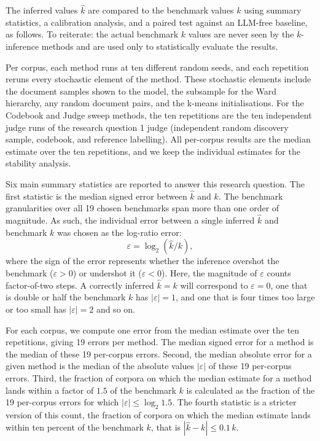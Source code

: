 \documentclass[11pt,a4paper,oneside]{report}
\begin{document}
The inferred values $\hat{k}$ are compared to the benchmark values $k$ using summary statistics, a calibration analysis, and a paired test against an LLM-free baseline, as follows. To reiterate: the actual benchmark $k$ values are never seen by the $k$-inference methods and are used only to statistically evaluate the results.

Per corpus, each method runs at ten different random seeds, and each repetition reruns every stochastic element of the method.  These stochastic elements include the document samples shown to the model, the subsample for the Ward hierarchy, any random document pairs, and the k-means initialisations. For the Codebook and Judge sweep methods, the ten repetitions are the ten independent judge runs of the research question 1 judge (independent random discovery sample, codebook, and reference labelling). All per-corpus results are the median estimate over the ten repetitions, and we keep the individual estimates for the stability analysis.

Six main summary statistics are reported to answer this research question. The first statistic is the median signed error between $\hat{k}$ and $k$. The benchmark granularities over all 19 chosen benchmarks span more than one order of magnitude. As such, the individual error between a single inferred $\hat{k}$ and benchmark $k$ was chosen as the log-ratio error:
\[
\varepsilon = \log_2\!\left(\hat{k} / k\right),
\]
where the sign of the error represents whether the inference overshot the benchmark ($\varepsilon > 0$) or undershot it ($\varepsilon < 0$). Here, the magnitude of $\varepsilon$ counts factor-of-two steps. A correctly inferred $\hat{k} = k$ will correspond to $\varepsilon = 0$, one that is double or half the benchmark $k$ has $|\varepsilon| = 1$, and one that is four times too large or too small has $|\varepsilon| = 2$ and so on.

For each corpus, we compute one error from the median estimate over the ten repetitions, giving 19 errors per method. The median signed error for a method is the median of these 19 per-corpus errors. Second, the median absolute error for a given method is the median of the absolute values $|\varepsilon|$ of these 19 per-corpus errors. Third, the fraction of corpora on which the median estimate for a method lands within a factor of $1.5$ of the benchmark $k$ is calculated as the fraction of the 19 per-corpus errors for which $|\varepsilon| \le \log_2 1.5$. The fourth statistic is a stricter version of this count, the fraction of corpora on which the median estimate lands within ten percent of the benchmark $k$, that is $|\hat{k} - k| \le 0.1\,k$.
\end{document}
